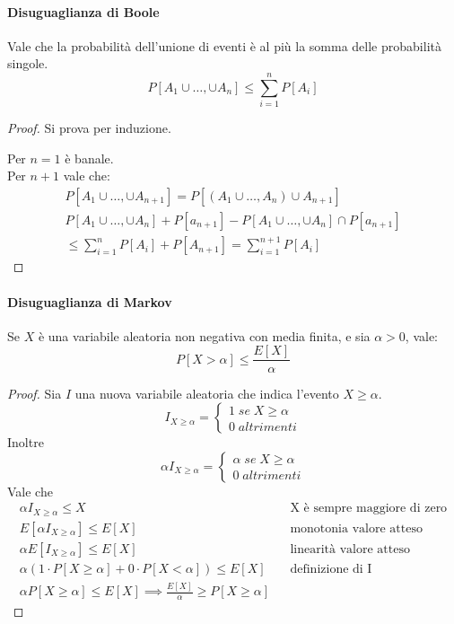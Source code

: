 \paragraph{Disuguaglianza di Boole}
Vale che la probabilità dell'unione di eventi è al più la somma delle probabilità singole.
$$P[A_1 \cup \dots, \cup A_n] \leq \sum_{i =1}^{n}P[A_i]$$
\begin{proof}
    Si prova per induzione.
    
    Per $n=1$ è banale.\\
    Per $n+1$ vale che:
    \begin{equation}
        \begin{aligned}
            P[A_1 \cup \dots, \cup A_{n+1}] = P[(A_1 \cup \dots, A_n)\cup A_{n+1}]\\
            P[A_1 \cup \dots, \cup A_n] + P[a_{n+1}] - P[A_1 \cup \dots, \cup A_n] \cap P[a_{n+1}]\\
            \leq \sum_{i =1}^{n}P[A_i] + P[A_{n+1}] = \sum_{i =1}^{n+1}P[A_i]
        \end{aligned}
    \end{equation}
\end{proof}

\paragraph{Disuguaglianza di Markov}
Se $X$ è una variabile aleatoria non negativa con media finita, e sia $\alpha > 0$, vale:
$$P[X > \alpha] \leq \frac{E[X]}{\alpha}$$
\begin{proof}
    Sia $I$ una nuova variabile aleatoria che indica l'evento $X \geq \alpha$.
    \[
        I_{X \geq \alpha} = 
        \begin{cases}
            1 \; \mathit{se}\; X \geq \alpha\\
            0 \; \mathit{altrimenti}
        \end{cases}\]
    Inoltre
    \[
        \alpha I_{X \geq \alpha} = 
        \begin{cases}
            \alpha \; \mathit{se}\; X \geq \alpha\\
            0 \; \mathit{altrimenti}
        \end{cases}\]
    Vale che
    \begin{equation}
        \begin{aligned}
            \alpha I_{X \geq \alpha} \leq X && \text{X è sempre maggiore di zero}\\
             E[\alpha I_{X \geq \alpha}] \leq E[X] && \text{monotonia valore atteso}\\
             \alpha E[ I_{X \geq \alpha}] \leq E[X] && \text{linearità valore atteso}\\
             \alpha (1\cdot P[X\geq \alpha] + 0\cdot P[X< \alpha]) \leq E[X] && \text{definizione di I}\\
             \alpha P[X\geq \alpha]\leq E[X] \implies \frac{E[X]}{\alpha} \geq P[X\geq \alpha]
        \end{aligned}
    \end{equation}
\end{proof}

